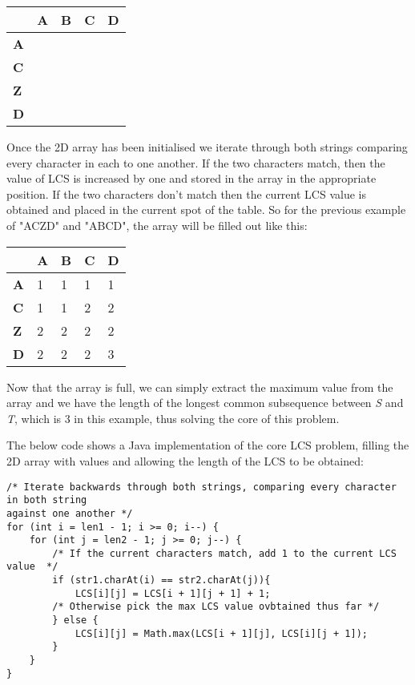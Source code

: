 \begin{table}[h]
	\centering
	\begin{tabular}{|l|l|l|l|l|}
		\hline
		& \textbf{A} & \textbf{B} & \textbf{C} & \textbf{D} \\ \hline
		\textbf{A} &  &  &  &  \\ \hline
		\textbf{C} &  &  &  &  \\ \hline
		\textbf{Z} &  &  &  &  \\ \hline
		\textbf{D} &  &  &  &  \\ \hline
	\end{tabular}
\end{table}
 
Once the 2D array has been initialised we iterate through both strings comparing every character in each to one another. If the two characters match, then the value of LCS is increased by one and stored in the array in the appropriate position. If the two characters don't match then the current LCS value is obtained and placed in the current spot of the table. So for the previous example of "ACZD" and "ABCD", the array will be filled out like this: 

\begin{table}[h]
	\centering
	\begin{tabular}{|l|l|l|l|l|}
		\hline
		& \textbf{A} & \textbf{B} & \textbf{C} & \textbf{D} \\ \hline
		\textbf{A} & 1 & 1 & 1 & 1 \\ \hline
		\textbf{C} & 1 & 1 & 2 & 2 \\ \hline
		\textbf{Z} & 2 & 2 & 2 & 2 \\ \hline
		\textbf{D} & 2 & 2 & 2 & 3 \\ \hline
	\end{tabular}
\end{table}
\noindent
Now that the array is full, we can simply extract the maximum value from the array and we have the length of the longest common subsequence between \textit{S} and \textit{T}, which is 3 in this example, thus solving the core of this problem.
\smallbreak\noindent

The below code shows a Java implementation of the core LCS problem, filling the 2D array with values and allowing the length of the LCS to be obtained:

\begin{lstlisting}
/* Iterate backwards through both strings, comparing every character in both string 
against one another */
for (int i = len1 - 1; i >= 0; i--) {
	for (int j = len2 - 1; j >= 0; j--) {
		/* If the current characters match, add 1 to the current LCS value  */
		if (str1.charAt(i) == str2.charAt(j)){
			LCS[i][j] = LCS[i + 1][j + 1] + 1;
		/* Otherwise pick the max LCS value ovbtained thus far */
		} else {
			LCS[i][j] = Math.max(LCS[i + 1][j], LCS[i][j + 1]);
		}
	}
}
\end{lstlisting}

